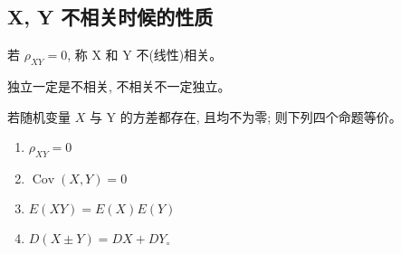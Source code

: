 \subsection{X, Y 不相关时候的性质}

若 $\rho_{X Y}=0$, 称 X 和 Y 不(线性)相关。 

\begin{corollary}
    独立一定是不相关, 不相关不一定独立。 
\end{corollary}

\begin{theorem}
    若随机变量 $X$ 与 Y 的方差都存在, 且均不为零; 则下列四个命题等价。 
    \begin{enumerate}
        \item $\rho_{X Y}=0$
        \item $\operatorname{Cov}(X, Y)=0$
        \item $E(X Y)=E (X) E (Y)$
        \item $D(X \pm Y)=D X+D Y_{\circ}$
    \end{enumerate}
\end{theorem}